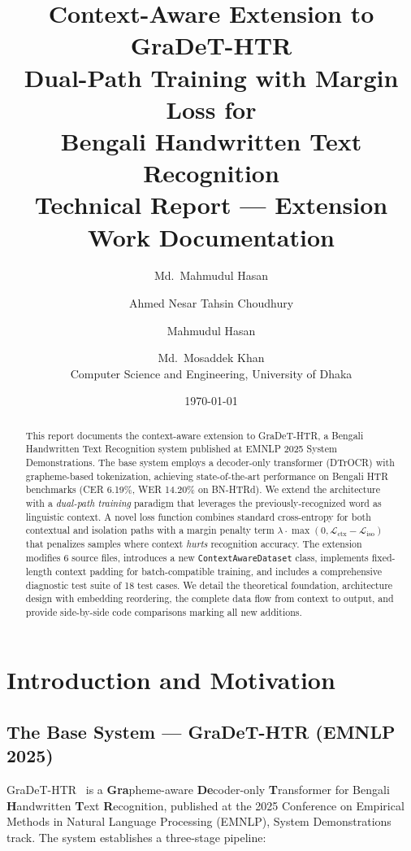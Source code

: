 \documentclass[11pt, a4paper]{report}
\title{%
  \vspace{-1cm}
  \textbf{Context-Aware Extension to GraDeT-HTR}\\[0.5em]
  \Large Dual-Path Training with Margin Loss for\\Bengali Handwritten Text Recognition\\[1em]
  \large Technical Report --- Extension Work Documentation
}
\author{%
  Md.\ Mahmudul Hasan \and Ahmed Nesar Tahsin Choudhury \and Mahmudul Hasan \and Md.\ Mosaddek Khan\\[0.5em]
  \normalsize Computer Science and Engineering, University of Dhaka
}
\date{\today}
\begin{document}

\maketitle
\thispagestyle{empty}

\begin{abstract}
This report documents the context-aware extension to GraDeT-HTR, a Bengali Handwritten Text Recognition system published at EMNLP 2025 System Demonstrations. The base system employs a decoder-only transformer (DTrOCR) with grapheme-based tokenization, achieving state-of-the-art performance on Bengali HTR benchmarks (CER 6.19\%, WER 14.20\% on BN-HTRd). We extend the architecture with a \emph{dual-path training} paradigm that leverages the previously-recognized word as linguistic context. A novel loss function combines standard cross-entropy for both contextual and isolation paths with a margin penalty term $\lambda \cdot \max(0, \mathcal{L}_{\mathrm{ctx}} - \mathcal{L}_{\mathrm{iso}})$ that penalizes samples where context \emph{hurts} recognition accuracy. The extension modifies 6 source files, introduces a new \texttt{ContextAwareDataset} class, implements fixed-length context padding for batch-compatible training, and includes a comprehensive diagnostic test suite of 18 test cases. We detail the theoretical foundation, architecture design with embedding reordering, the complete data flow from context to output, and provide side-by-side code comparisons marking all new additions.
\end{abstract}

\tableofcontents
\newpage

\chapter{Introduction and Motivation}
\label{ch:introduction}

\section{The Base System --- GraDeT-HTR (EMNLP 2025)}
\label{sec:base-system}

GraDeT-HTR~\cite{gradet2025} is a \textbf{Gra}pheme-aware \textbf{De}coder-only \textbf{T}ransformer for Bengali \textbf{H}andwritten \textbf{T}ext \textbf{R}ecognition, published at the 2025 Conference on Empirical Methods in Natural Language Processing (EMNLP), System Demonstrations track. The system establishes a three-stage pipeline:
\end{document}
